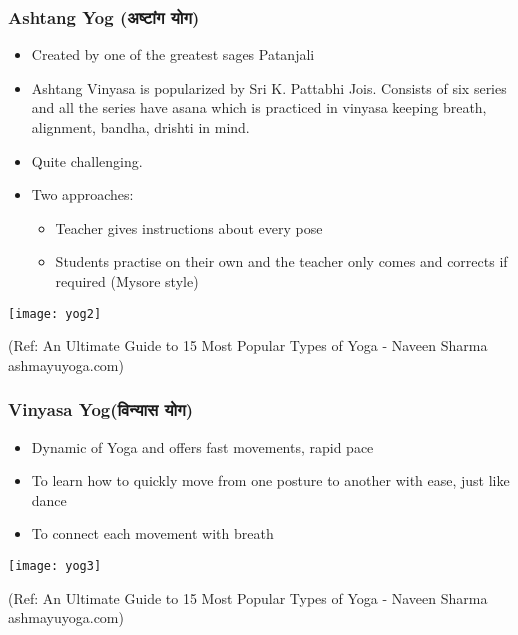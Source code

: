 \begin{frame}[fragile]\frametitle{Ashtang Yog (अष्टांग योग)}
	\begin{itemize}
	\item Created by one of the greatest sages Patanjali
	\item Ashtang Vinyasa is popularized by Sri K. Pattabhi Jois. Consists of six series and all the series have asana which is practiced in vinyasa keeping breath, alignment, bandha, drishti in mind.
	\item Quite challenging.
	\item Two approaches:
	\begin{itemize}
	\item Teacher gives instructions about every pose
	\item Students practise on their own and the teacher only comes and corrects if required (Mysore style)
	
	\end{itemize}
	\end{itemize}

\begin{center}
\texttt{[image: yog2]}

\tiny{(Ref: An Ultimate Guide to 15 Most Popular Types of Yoga - Naveen Sharma ashmayuyoga.com)}
\end{center}

\end{frame}

\begin{frame}[fragile]\frametitle{Vinyasa Yog(विन्यास योग)}
	\begin{itemize}
	\item Dynamic of Yoga and offers fast movements, rapid pace
	\item To learn how to quickly move from one posture to another with ease, just like dance
	\item To connect each movement with breath
	\end{itemize}

\begin{center}
\texttt{[image: yog3]}

\tiny{(Ref: An Ultimate Guide to 15 Most Popular Types of Yoga - Naveen Sharma ashmayuyoga.com)}
\end{center}

\end{frame}

